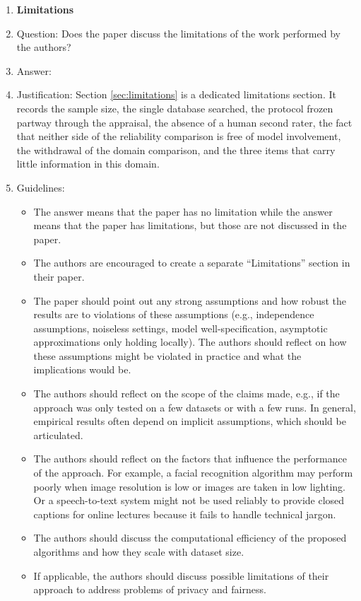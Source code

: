 \documentclass{article}
\begin{document}
\begin{enumerate}
\item {\bf Limitations}
    \item[] Question: Does the paper discuss the limitations of the work performed by the authors?
    \item[] Answer: \answerYes{}
    \item[] Justification: Section \ref{sec:limitations} is a dedicated limitations section. It records the sample size, the single database searched, the protocol frozen partway through the appraisal, the absence of a human second rater, the fact that neither side of the reliability comparison is free of model involvement, the withdrawal of the domain comparison, and the three items that carry little information in this domain.
    \item[] Guidelines:
    \begin{itemize}
        \item The answer \answerNA{} means that the paper has no limitation while the answer \answerNo{} means that the paper has limitations, but those are not discussed in the paper. 
        \item The authors are encouraged to create a separate ``Limitations'' section in their paper.
        \item The paper should point out any strong assumptions and how robust the results are to violations of these assumptions (e.g., independence assumptions, noiseless settings, model well-specification, asymptotic approximations only holding locally). The authors should reflect on how these assumptions might be violated in practice and what the implications would be.
        \item The authors should reflect on the scope of the claims made, e.g., if the approach was only tested on a few datasets or with a few runs. In general, empirical results often depend on implicit assumptions, which should be articulated.
        \item The authors should reflect on the factors that influence the performance of the approach. For example, a facial recognition algorithm may perform poorly when image resolution is low or images are taken in low lighting. Or a speech-to-text system might not be used reliably to provide closed captions for online lectures because it fails to handle technical jargon.
        \item The authors should discuss the computational efficiency of the proposed algorithms and how they scale with dataset size.
        \item If applicable, the authors should discuss possible limitations of their approach to address problems of privacy and fairness.

\end{itemize}
\end{enumerate}
\end{document}
